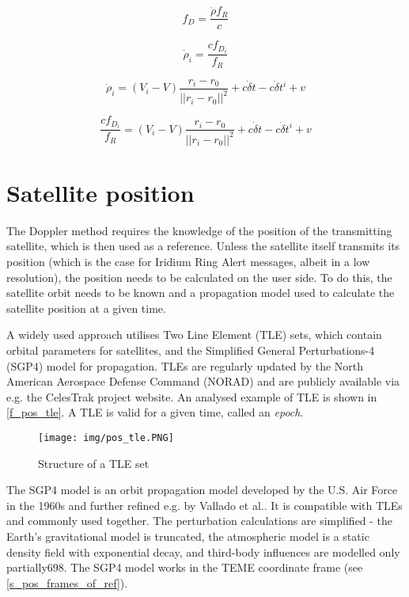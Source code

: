 \begin{equation}
    f_D = \frac{\dot\rho f_R}{c}
\end{equation}

\begin{equation}
    \dot\rho_i = \frac{c f_{D_i}}{f_R}
\end{equation}

\begin{equation}
    \dot\rho_i = (V_i - V) \frac{r_i - r_0}{||r_i - r_0||^2} + c \dot\delta t - c \dot \delta t^i + v
\end{equation}


\begin{equation}
    \frac{c f_{D_i}}{f_R} = (V_i - V) \frac{r_i - r_0}{||r_i - r_0||^2} + c \dot\delta t - c \dot \delta t^i + v
\end{equation}


\section{Satellite position}
\label{s_pos_tle_sgp4} 
The Doppler method requires the knowledge of the position of the transmitting satellite, which is then used as a reference. Unless the satellite itself transmits its position (which is the case for Iridium Ring Alert messages, albeit in a low resolution), the position needs to be calculated on the user side. To do this, the satellite orbit needs to be known and a propagation model used to calculate the satellite position at a given time.

A widely used approach utilises Two Line Element (TLE) sets, which contain orbital parameters for satellites, and the Simplified General Perturbations-4 (SGP4) model for propagation. TLEs are regularly updated by the North American Aerospace Defense Command (NORAD) and are publicly available via e.g. the CelesTrak project website\cite{des11}. An analysed example of TLE is shown in \autoref{f_pos_tle}. A TLE is valid for a given time, called an \textit{epoch}.

\begin{figure}
    \centering
    \texttt{[image: img/pos\_tle.PNG]}
    \caption{Structure of a TLE set\cite{pos06}}
    \label{f_pos_tle}
\end{figure}

The SGP4 model is an orbit propagation model developed by the U.S. Air Force in the 1960s and further refined e.g. by Vallado et al.\cite{des06}. It is compatible with TLEs and commonly used together. The perturbation calculations are simplified - the Earth’s gravitational model is truncated, the atmospheric model is a static density field with exponential decay, and third-body influences are modelled only partially\citep{pos01}{698}. The SGP4 model works in the TEME coordinate frame (see \autoref{s_pos_frames_of_ref}).


